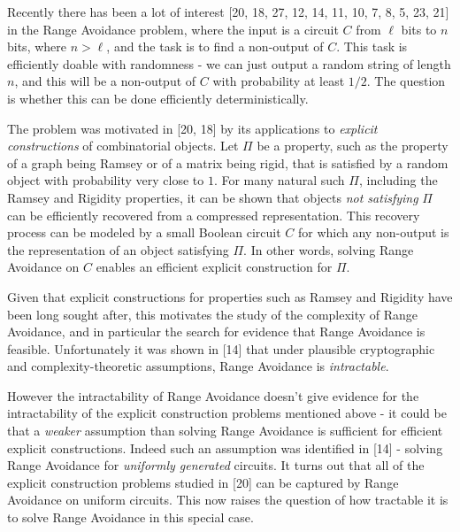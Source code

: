 Recently there has been a lot of interest [20, 18, 27, 12, 14, 11, 10, 7, 8, 5, 23, 21] in the Range Avoidance problem, where the input is a circuit $C$ from $\ell$ bits to $n$ bits, where $n>\ell$, and the task is to find a non-output of $C$. This task is efficiently doable with randomness - we can just output a random string of length $n$, and this will be a non-output of $C$ with probability at least $1/2$. The question is whether this can be done efficiently deterministically.\par




The problem was motivated in [20, 18] by its applications to \emph{explicit constructions} of combinatorial objects. Let $\Pi$ be a property, such as the property of a graph being Ramsey or of a matrix being rigid, that is satisfied by a random object with probability very close to $1$. For many natural such $\Pi$, including the Ramsey and Rigidity properties, it can be shown that objects \emph{not satisfying} $\Pi$ can be efficiently recovered from a compressed representation. This recovery process can be modeled by a small Boolean circuit $C$ for which any non-output is the representation of an object satisfying $\Pi$. In other words, solving Range Avoidance on $C$
enables an efficient explicit construction for $\Pi$.\par




Given that explicit constructions for properties such as Ramsey and Rigidity have been long sought after, this motivates the study of the complexity of Range Avoidance, and in particular the search for evidence that Range Avoidance is feasible. Unfortunately it was shown in [14] that under plausible cryptographic and complexity-theoretic assumptions, Range Avoidance is \emph{intractable}.\par




However the intractability of Range Avoidance doesn’t give evidence for the intractability of the explicit construction problems mentioned above - it could be that a \emph{weaker} assumption than solving Range Avoidance is sufficient for efficient explicit constructions. Indeed such an assumption was identified in [14] - solving Range Avoidance for \emph{uniformly generated} circuits. It turns out that all of the explicit construction problems studied in [20] can be captured by Range Avoidance on uniform circuits. This now raises the question of how tractable it is to solve Range Avoidance in this special case. 

